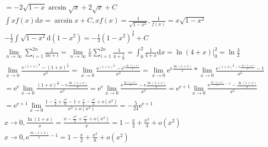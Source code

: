 \documentclass{article}
\begin{document}
\begin{align*}
    = -2\sqrt{1-x}\arcsin \sqrt{x} + 2\sqrt{x} + C \\ 
   \int xf(x)\mathrm{d}x = \arcsin x + C ,xf(x) = \frac{1}{\sqrt{1-x^2}} , \frac{1}{f(x)} = x\sqrt{1-x^2} \\
   -\frac{1}{2} \int \sqrt{1-x^2} \mathrm{d}(1-x^2) = -\frac{1}{3}(1-x^2)^{\frac{3}{2}} + C\\
    \lim_{n \to \infty} \sum_{i = 1}^{2n}\frac{1}{4n+i} = \lim_{n \to \infty} \frac{1}{n} \sum_{i=1}^{2n} \frac{1}{4+\frac{i}{n}} = \int_{0}^{2} \frac{1}{4+x} \mathrm{d}x = \ln(4+x) |_{0}^{2} = \ln\frac{3}{2} \\
    \lim_{x \to 0} \frac{\mathrm{e}^{(1+x)^{\frac{1}{x}}} - (1+x)^{\frac{\mathrm{e}}{x}}}{x^2} = \lim_{x \to 0} \frac{ \mathrm{e}^{(1+x)^{\frac{1}{x}}} - \mathrm{e}^{\mathrm{e} \frac{\ln(1+x)}{x}}} {x^2} = \lim_{x \to 0} \mathrm{e}^{\mathrm{e} \frac{\ln(1+x)}{x}} * \lim_{x \to 0} \frac{\mathrm{e}^{(1+x)^{\frac{1}{x}}-\mathrm{e}\frac{\ln(1+x)}{x}} - 1 }{x^2} \\
    = \mathrm{e}^{\mathrm{e}} \lim_{x \to 0} \frac{(1+x)^{\frac{1}{x}}-\mathrm{e}\frac{\ln(1+x)}{x}}{x^2} = \mathrm{e}^{\mathrm{e}} \lim_{x \to 0} \frac{\mathrm{e}^{\frac{\ln(1+x)}{x}} - \mathrm{e}\frac{\ln(1+x)}{x}}{x^2} = \mathrm{e}^{\mathrm{e}+1} \lim_{x \to 0} \frac{\mathrm{e}^{\frac{\ln(1+x)}{x}-1}-\frac{\ln(1+x)}{x} }{x^2}\\
    = \mathrm{e}^{\mathrm{e}+1} \lim_{x \to 0} \frac{1-\frac{x}{2}+\frac{x^2}{8} -1 +\frac{x}{2} -\frac{x^2}{3} + o(x^2)}{x^2+o(x^2)} = -\frac{5}{24}\mathrm{e}^{\mathrm{e}+1} \\
    {x \to 0} , \frac{\ln(1+x)}{x} = \frac{x-\frac{x^2}{2}+ \frac{x^3}{3} + o(x^3)}{x} = 1-\frac{x}{2} + \frac{x^2}{3} + o(x^2) \\
    {x \to 0} , \mathrm{e}^{\frac{\ln(1+x)}{x} - 1} = 1 - \frac{x}{2} + \frac{x^2}{8} + o(x^2) \\ 
\end{align*}
\end{document}
